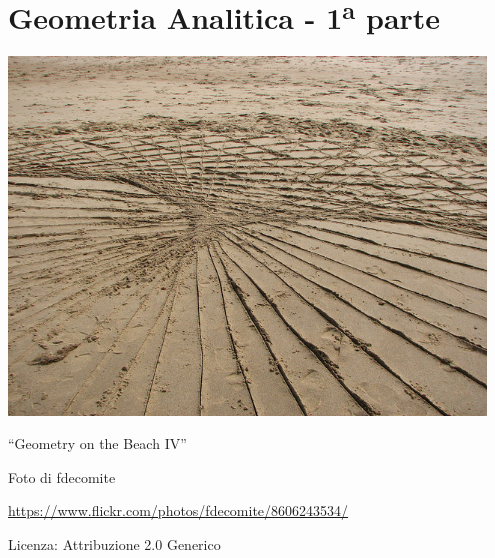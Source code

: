 \part{Geometria Analitica - 1\textsuperscript{a} parte}

\includegraphics[width=0.95\textwidth]{img/geometry_beach4.jpg}
  \begin{center}
    {\large ``Geometry on the Beach IV''}\par
    Foto di fdecomite\par
    \url{https://www.flickr.com/photos/fdecomite/8606243534/}\par
    Licenza: Attribuzione 2.0 Generico\par
  \end{center}
\clearpage
\cleardoublepage

